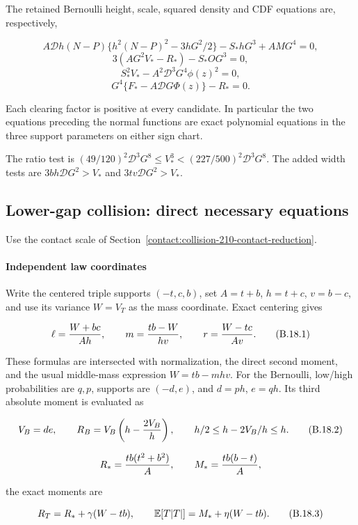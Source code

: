 The retained Bernoulli height, scale, squared density and CDF equations
are, respectively,

\[
 A\mathcal D h(N-P)\{h^2(N-P)^2-3hG^2/2\}
                  -S_*hG^3+A MG^4=0,
\]
\[
 3(AG^2V_*-R_*)-S_*OG^3=0,
\]
\[
 S_*^2V_*-A^2\mathcal D^3G^4\phi(z)^2=0,
\]
\[
 G^4\{F_*-A\mathcal D G\Phi(z)\}-R_*=0.
\tag{B.17.7}\label{contact:collision-210-mass-elimination-7}
\]

Each clearing factor is positive at every candidate. In particular the
two equations preceding the normal functions are exact polynomial
equations in the three support parameters on either sign chart.

The ratio test is
$(49/120)^2 \mathcal D^3 G^8\le V_*^3<(227/500)^2 \mathcal D^3 G^8$.
The added width tests are
$3bh \mathcal D G^2>V_*$ and $3tv \mathcal D G^2>V_*$.
\subsection{Lower-gap collision: direct necessary equations}\label{contact:collision-210-raw-law-replay}
Use the contact scale of Section~\ref{contact:collision-210-contact-reduction}.



\paragraph{Independent law coordinates}

Write the centered triple supports $(-t,c,b)$, set $A=t+b$, $h=t+c$,
$v=b-c$, and use its variance $W=V_T$ as the mass coordinate. Exact
centering gives

\[
 \ell={W+bc\over Ah},\qquad m={tb-W\over hv},
 \qquad r={W-tc\over Av}. \tag{B.18.1}\label{contact:collision-210-raw-law-replay-1}
\]

These formulas are intersected with normalization, the direct second
moment, and the usual middle-mass expression $W=tb-mhv$.
For the Bernoulli, low/high probabilities are $q,p$, supports are
$(-d,e)$, and $d=ph$, $e=qh$. Its third absolute moment is evaluated as

\[
 V_B=de,\qquad R_B=V_B\left(h-{2V_B\over h}\right),
 \qquad h/2\le h-2V_B/h\le h. \tag{B.18.2}\label{contact:collision-210-raw-law-replay-2}
\]

\[
 R_*={tb(t^2+b^2)\over A},\qquad M_*={tb(b-t)\over A},
\]

the exact moments are

\[
 R_T=R_*+\gamma(W-tb),\qquad
 \mathbb E[T|T|]=M_*+\eta(W-tb). \tag{B.18.3}\label{contact:collision-210-raw-law-replay-3}
\]

